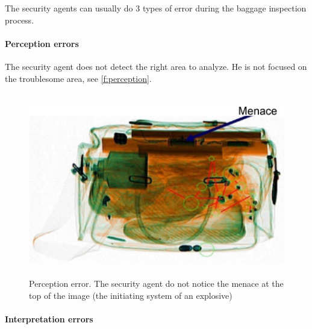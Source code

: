 The security agents can usually do 3 types of error during the baggage inspection process.

\paragraph{Perception errors}

The security agent does not detect the right area to analyze. He is not focused on the troublesome area, see  \autoref{f:perception}.
\begin{figure}
\centering
	\includegraphics[height=8cm]{Figures/perceptionError}
	\caption{Perception error. The security agent do not notice the menace at the top of the image (the initiating system of an explosive) }
	\label{f:perception}
\end{figure}

\paragraph{Interpretation errors}

